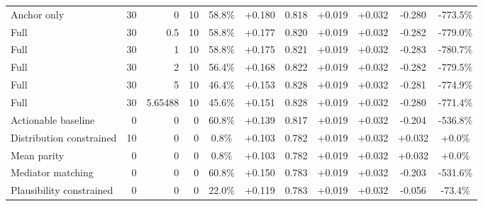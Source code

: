 \begin{table}[htbp]
\begin{tabular}{lrrrccccccc}
Anchor only & 30 & 0 & 10 & 58.8\% & +0.180 & 0.818 & +0.019 & +0.032 & -0.280 & -773.5\% \\
Full & 30 & 0.5 & 10 & 58.8\% & +0.177 & 0.820 & +0.019 & +0.032 & -0.282 & -779.0\% \\
Full & 30 & 1 & 10 & 58.8\% & +0.175 & 0.821 & +0.019 & +0.032 & -0.283 & -780.7\% \\
Full & 30 & 2 & 10 & 56.4\% & +0.168 & 0.822 & +0.019 & +0.032 & -0.282 & -779.5\% \\
Full & 30 & 5 & 10 & 46.4\% & +0.153 & 0.828 & +0.019 & +0.032 & -0.281 & -774.9\% \\
Full & 30 & 5.65488 & 10 & 45.6\% & +0.151 & 0.828 & +0.019 & +0.032 & -0.280 & -771.4\% \\
Actionable baseline & 0 & 0 & 0 & 60.8\% & +0.139 & 0.817 & +0.019 & +0.032 & -0.204 & -536.8\% \\
Distribution constrained & 10 & 0 & 0 & 0.8\% & +0.103 & 0.782 & +0.019 & +0.032 & +0.032 & +0.0\% \\
Mean parity & 0 & 0 & 0 & 0.8\% & +0.103 & 0.782 & +0.019 & +0.032 & +0.032 & +0.0\% \\
Mediator matching & 0 & 0 & 0 & 60.8\% & +0.150 & 0.783 & +0.019 & +0.032 & -0.203 & -531.6\% \\
Plausibility constrained & 0 & 0 & 0 & 22.0\% & +0.119 & 0.783 & +0.019 & +0.032 & -0.056 & -73.4\% \\
\bottomrule
\end{tabular}
\end{table}